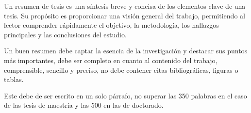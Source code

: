 Un resumen de tesis es una síntesis breve y concisa de los elementos clave de una tesis. Su propósito es proporcionar una visión general del trabajo, permitiendo al lector comprender rápidamente el objetivo, la metodología, los hallazgos principales y las conclusiones del estudio. 

Un buen resumen debe captar la esencia de la investigación y destacar sus puntos más importantes, debe ser completo en cuanto al contenido del trabajo, comprensible, sencillo y preciso, no debe contener citas bibliográficas, figuras o tablas. 

Este debe de ser escrito en un solo párrafo, no superar las 350 palabras en el caso de las tesis de maestría y las 500 en las de doctorado.